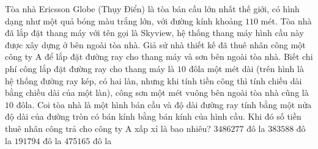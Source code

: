 \begin{ex}%
	Tòa nhà Ericsson Globe (Thụy Điển) là tòa bán cầu lớn nhất thế giới, có hình dạng như một quả bóng màu trắng lớn, với đường kính khoảng $110$ mét. Tòa nhà đã lắp đặt thang máy với tên gọi là Skyview, hệ thống thang máy hình cầu này được xây dựng ở bên ngoài tòa nhà. Giả sử nhà thiết kế đã thuê nhân công một công ty A để lắp đặt đường ray cho thang máy và sơn bên ngoài tòa nhà. Biết chi phí công lắp đặt đường ray cho thang máy là $10$ đôla một mét dài (trên hình là hệ thống đường ray kép, có hai làn, nhưng khi tính tiền công thì tính chiều dài bằng chiều dài của một làn), công sơn một mét vuông bên ngoài tòa nhà cũng là $10$ đôla. Coi tòa nhà là một hình bán cầu và độ dài đường ray tính bằng một nửa độ dài của đường tròn có bán kính bằng bán kính của hình cầu. Khi đó số tiền thuê nhân công trả cho công ty A xấp xỉ là bao nhiêu? 
	\choice
	{$\text{3486277}$ đô la}
	{$\text{383588}$ đô la}
	{\True $\text{191794}$ đô la}
	{$\text{475165}$ đô la}
\end{ex}
